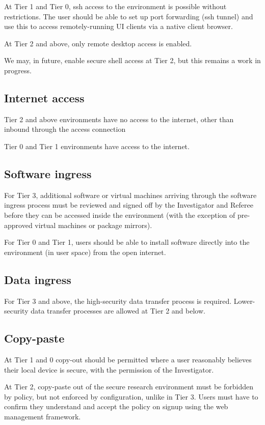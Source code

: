 \documentclass[10pt,a4paper,twocolumn]{article}
\begin{document}
At Tier 1 and Tier 0, ssh access to the environment is possible without restrictions. The user should be able to set up port forwarding (ssh tunnel) and use this to access remotely-running UI clients via a native client browser.

At Tier 2 and above, only remote desktop access is enabled.

We may, in future, enable secure shell access at Tier 2, but this remains a work in progress.

\subsection{Internet access}

Tier 2 and above environments have no access to the internet, other than inbound through the 
access connection

Tier 0 and Tier 1 environments have access to the internet.

\subsection{Software ingress}

For Tier 3, 
additional software or virtual machines arriving through the software
ingress process must be reviewed and signed off by the Investigator and Referee before they can be accessed inside the environment (with the exception of pre-approved virtual machines or package mirrors).

For Tier 0 and Tier 1, users should be able to install software directly into the environment (in user space) from the open internet.

\subsection{Data ingress}

For Tier 3 and above, the high-security data transfer process is required.
Lower-security data transfer processes are allowed at Tier 2 and below.

\subsection{Copy-paste}

At Tier 1 and 0 copy-out should be permitted where a user reasonably believes their local device is secure, with the permission of the Investigator.

At Tier 2, copy-paste out of the secure research environment must be forbidden by policy, but not enforced by configuration, unlike in Tier 3. Users must have to confirm they understand and accept the policy on signup using the web management framework.
\end{document}
